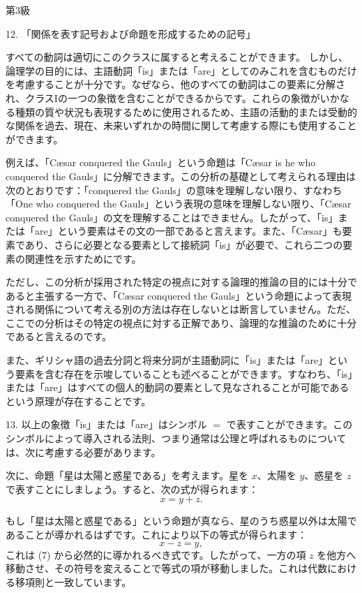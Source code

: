 \documentclass[a4paper,11pt,openany]{ltjsbook}
\begin{document}
\centerline{第3級}

12. 「関係を表す記号および命題を形成するための記号」

すべての動詞は適切にこのクラスに属すると考えることができます。
しかし、論理学の目的には、主語動詞「is」または「are」としてのみこれを含むものだけを考慮することが十分です。なぜなら、他のすべての動詞はこの要素に分解され、クラスIの一つの象徴を含むことができるからです。これらの象徴がいかなる種類の質や状況も表現するために使用されるため、主語の活動的または受動的な関係を過去、現在、未来いずれかの時間に関して考慮する際にも使用することができます。

例えば、「Cæsar conquered the Gauls」という命題は「Cæsar is he who conquered the Gauls」に分解できます。この分析の基礎として考えられる理由は次のとおりです：「conquered the Gauls」の意味を理解しない限り、すなわち「One who conquered the Gauls」という表現の意味を理解しない限り、「Cæsar conquered the Gauls」の文を理解することはできません。したがって、「is」または「are」という要素はその文の一部であると言えます。また、「Cæsar」も要素であり、さらに必要となる要素として接続詞「is」が必要で、これら二つの要素の関連性を示すためにです。

ただし、この分析が採用された特定の視点に対する論理的推論の目的には十分であると主張する一方で、「Cæsar conquered the Gauls」という命題によって表現される関係について考える別の方法は存在しないとは断言していません。ただ、ここでの分析はその特定の視点に対する正解であり、論理的な推論のために十分であると言えるのです。

また、ギリシャ語の過去分詞と将来分詞が主語動詞に「is」または「are」という要素を含む存在を示唆していることも述べることができます。すなわち、「is」または「are」はすべての個人的動詞の要素として見なされることが可能であるという原理が存在することです。

13. 以上の象徴「is」または「are」はシンボル $=$ で表すことができます。このシンボルによって導入される法則、つまり通常は公理と呼ばれるものについては、次に考慮する必要があります。

次に、命題「星は太陽と惑星である」を考えます。星を \(x\)、太陽を \(y\)、惑星を \(z\) で表すことにしましょう。すると、次の式が得られます：
\[
x = y + z.
\]

もし「星は太陽と惑星である」という命題が真なら、星のうち惑星以外は太陽であることが導かれるはずです。これにより以下の等式が得られます：
\[
x - z = y,
\]
これは (7) から必然的に導かれるべき式です。したがって、一方の項 \(z\) を他方へ移動させ、その符号を変えることで等式の項が移動しました。これは代数における移項則と一致しています。
\end{document}
